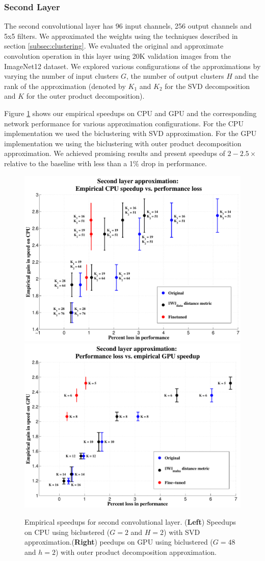 \subsubsection{Second Layer}
The second convolutional layer has 96 input channels, 256 output channels and 5x5 filters. 
We approximated the weights using the techniques described in section \ref{subsec:clustering}. 
We evaluated the original and approximate convolution operation in
this layer using 20K validation images from the ImageNet12 dataset. 
We explored various configurations of the approximations by varying the number of input clusters $G$, the number of output clusters $H$ and the rank of the approximation (denoted by $K_1$ and $K_2$ for the SVD decomposition and $K$ for the outer product decomposition). 

Figure \ref{fig:biclust_speedups} shows our empirical speedups on CPU
and GPU and the corresponding network performance for
various approximation configurations. For the CPU implementation we used the biclustering with SVD approximation. For the GPU implementation we using the biclustering with outer product decomposition approximation.  
We achieved promising results and present speedups of $2-2.5\times$ relative to the baseline with less than a 1\% drop in performance.

\begin{figure}[t]
\centering
\begin{minipage}{0.9\textwidth}
      \includegraphics[width=0.5\linewidth]{img/layer2_CPUspeedup_vs_performance_loss_finetune_and_orig.pdf}
      \quad\quad
      \includegraphics[width=0.5\linewidth]{img/layer2_GPUspeedup_vs_performance_loss_finetune_and_orig.pdf}
\end{minipage}
\caption{Empirical speedups for second convolutional layer. ({\bf Left}) Speedups on CPU using biclustered ($G = 2$ and $H = 2$) with SVD approximation.({\bf Right}) peedups on GPU using biclustered ($G = 48$ and $h = 2$) with outer product decomposition approximation.}
\label{fig:biclust_speedups}
\end{figure}

